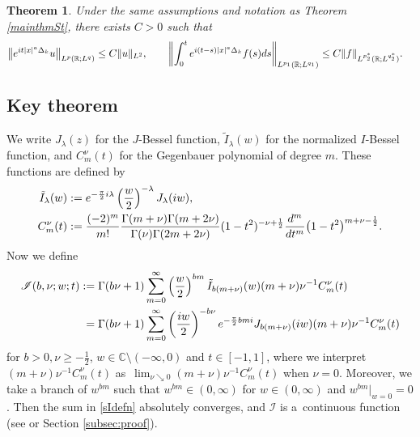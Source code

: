 \documentclass[10pt,a4paper]{article}
\numberwithin{equation}{section}
\newtheorem{Theorem}{Theorem}[section]
\def\R{\mathbb{R}}%
\def\l{\lambda}
\def\n{\nu}
\newcommand{\sI}{\mathscr{I}}
\begin{document}
\begin{Theorem}\label{coroSt}
Under the same assumptions and notation as Theorem {\rm\ref{mainthmSt}}, there exists $C>0$ such that
\begin{align*}
&\big\|{\rm e}^{{\rm i}t|x|^a\Delta_k}u\big\|_{L^p(\R; L^q)}\leq C\|u\|_{L^2},\qquad\left\|\int_{0}^t{\rm e}^{{\rm i}(t-s)|x|^a\Delta_k}f(s){\rm d}s \right\|_{L^{p_1}(\R; L^{q_1})} \leq C\|f\|_{L^{p_2^*}(\R; L^{q_2^*})}.
\end{align*}
\end{Theorem}

\subsection{Key theorem}
We write $J_{\lambda}(z)$ for the $J$-Bessel function, $\tilde{I}_{\lambda}(w)$ for the normalized $I$-Bessel function, and $C^{\nu}_m(t)$ for
the Gegenbauer polynomial of degree $m$.
These functions are defined by
\begin{align*}
\tilde{I}_{\lambda}(w):={}&{\rm e}^{-\frac{\pi}{2}{\rm i}\l}\left(\frac{w}{2}\right)^{-\l}J_{\l}({\rm i}w),\\
C^{\nu}_m(t):={}&\frac{(-2)^m}{m!}\frac{\Gamma(m+\nu)\Gamma(m+2\nu)}{\Gamma(\nu)\Gamma(2m+2\nu)}(1-t^2)^{-\nu+\frac{1}{2}}\frac{{\rm d}^m}{{\rm d}t^m}\bigl(1-t^2\bigr)^{m+\nu-\frac{1}{2}}.
\end{align*}
Now we define
\begin{align}\label{sIdefn}
\sI(b,\nu;w;t):={}&
\Gamma(b\nu+1)\sum_{m=0}^{\infty}\left(\frac{w}{2}\right)^{bm}\tilde{I}_{b(m+\nu)}(w)(m+\nu)\n^{-1}C^{\nu}_m(t)\\
={}&\Gamma(b\nu+1)\sum_{m=0}^{\infty}\left(\frac{{\rm i}w}{2}\right)^{-b\nu}{\rm e}^{-\frac{\pi}{2}bm {\rm i}}J_{b(m+\nu)}({\rm i}w)(m+\nu)\n^{-1}C^{\nu}_m(t)\notag
\end{align}
for $b>0,\n\geq -\frac{1}{2}$, $w\in\mathbb{C}\setminus (-\infty,0)$ and $t\in [-1,1]$, where we interpret $(m+\nu)\nu^{-1}C^{\nu}_m(t)$ as~${\lim_{\n\searrow 0}(m+\nu)\n^{-1}C^{\nu}_m(t)}$ when $\n=0$. Moreover, we take a branch of $w^{bm}$ such that $w^{bm}\in (0,\infty)$ for $w\in (0,\infty)$ and $w^{bm}|_{w=0}=0$.
Then the sum in \eqref{sIdefn} absolutely converges, and $\sI$ is a~continuous function (see \cite[Lemma 4.17\,(1)]{BKO} or Section \ref{subsec:proof}).
\end{document}
